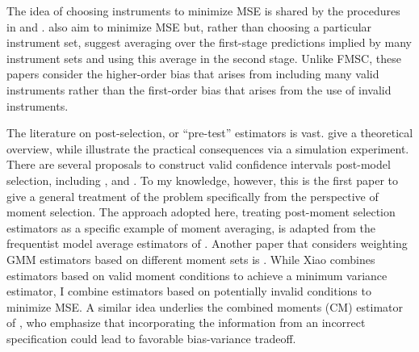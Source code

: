 

The idea of choosing instruments to minimize MSE is shared by the procedures in \cite{DonaldNewey2001} and \cite{DonaldImbensNewey2009}. 
\cite{KuersteinerOkui2010} also aim to minimize MSE but, rather than choosing a particular instrument set, suggest averaging over the first-stage predictions implied by many instrument sets and using this average in the second stage. 
Unlike FMSC, these papers consider the higher-order bias that arises from including many valid instruments rather than the first-order bias that arises from the use of invalid instruments.

The literature on post-selection, or ``pre-test'' estimators is vast. 
\citet{LeebPoetscher2005, LeebPoetscher2009}  give a theoretical overview, while \cite{Demetrescu} illustrate the practical consequences via a simulation experiment. 
There are several proposals to construct valid confidence intervals post-model selection, including \cite{Kabaila1998}, \cite{HjortClaeskens} and \cite{KabailaLeeb2006}. 
To my knowledge, however, this is the first paper to give a general treatment of the problem specifically from the perspective of moment selection. 
The approach adopted here, treating post-moment selection estimators as a specific example of moment averaging, is adapted from the frequentist model average estimators of \cite{HjortClaeskens}.
Another paper that considers weighting GMM estimators based on different moment sets is \cite{Xiao}. 
While Xiao combines estimators based on valid moment conditions to achieve a minimum variance estimator, I combine estimators based on potentially invalid conditions to minimize MSE. 
A similar idea underlies the combined moments (CM) estimator of \cite{Judge2007}, who emphasize that incorporating the information from an incorrect specification could lead to favorable bias-variance tradeoff. 

